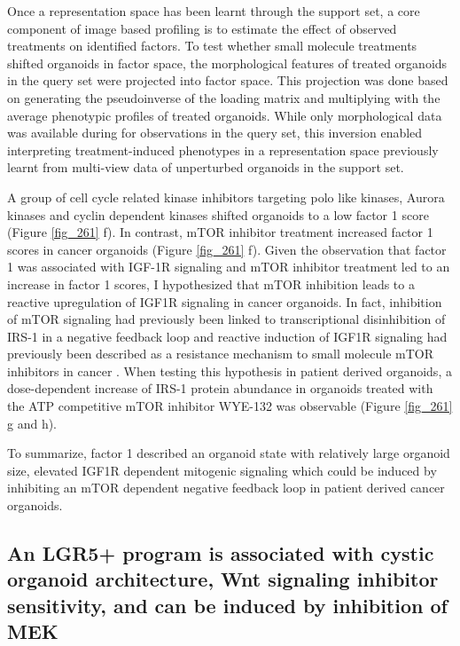 \begin{flushleft}
Once a representation space has been learnt through the support set, a core component of image based profiling is to estimate the effect of observed treatments on identified factors. To test whether small molecule treatments shifted organoids in factor space, the morphological features of treated organoids in the query set were projected into factor space. This projection was done based on generating the pseudoinverse of the loading matrix and multiplying with the average phenotypic profiles of treated organoids. While only morphological data was available during for observations in the query set, this inversion enabled interpreting treatment-induced phenotypes in a representation space previously learnt from multi-view data of unperturbed organoids in the support set. 

\bigbreak
A group of cell cycle related kinase inhibitors targeting polo like kinases, Aurora kinases and cyclin dependent kinases shifted organoids to a low factor 1 score (Figure \ref{fig_261} f). In contrast, mTOR inhibitor treatment increased factor 1 scores in cancer organoids (Figure \ref{fig_261} f). Given the observation that factor 1 was associated with IGF-1R signaling and mTOR inhibitor treatment led to an increase in factor 1 scores, I hypothesized that mTOR inhibition leads to a reactive upregulation of IGF1R signaling in cancer organoids. In fact, inhibition of mTOR signaling had previously been linked to transcriptional disinhibition of IRS-1 in a negative feedback loop \citep{oreillyMTORInhibitionInduces2006} and  reactive induction of IGF1R signaling had previously been described as a resistance mechanism to small molecule mTOR inhibitors in cancer \citep{sharmaChromatinmediatedReversibleDrugtolerant2010}. When testing this hypothesis in patient derived organoids, a dose-dependent increase of IRS-1 protein abundance in organoids treated with the ATP competitive mTOR inhibitor WYE-132 was observable (Figure \ref{fig_261} g and h). 

\bigbreak
To summarize, factor 1 described an organoid state with relatively large organoid size, elevated IGF1R dependent mitogenic signaling which could be induced by inhibiting an mTOR dependent negative feedback loop in patient derived cancer organoids.

\newpage
\subsection{An LGR5+ program is associated with cystic organoid architecture, Wnt signaling inhibitor sensitivity, and can be induced by inhibition of MEK}


\end{flushleft}
